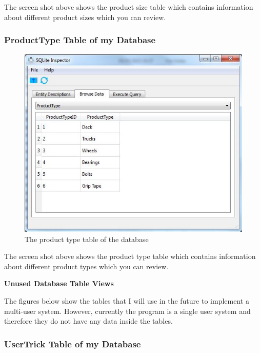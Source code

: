 The screen shot above shows the product size table which contains information about different product sizes which you can review.


\subsubsection{ProductType Table of my Database}
\begin{figure}[H]
    \includegraphics[width=\textwidth]{./Maintenance/Figures/ProductTypeTable.jpg}
    \caption{The product type table of the database} \label{fig:ProductType Table}
\end{figure}

The screen shot above shows the product type table which contains information about different product types which you can review.

\textbf{Unused Database Table Views}

The figures below show the tables that I will use in the future to implement a multi-user system. However, currently the program is a single user system and therefore they do not have any data inside the tables.

\subsubsection{UserTrick Table of my Database}

